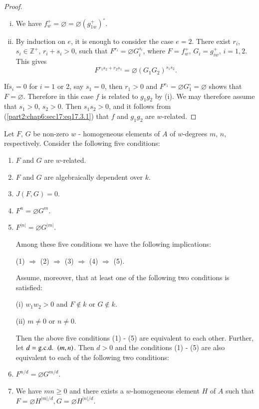 \begin{proof}
  ~
\begin{enumerate}[(i)]
  \item We have $f_w^+= \diameter = \diameter (g_{1w}^+)^\circ$.
    \item By induction on $e$, it is enough to consider the case
      $e=2$. There exist $r_i$, $s_i \in \mathbb{Z}^+$, $r_i + s_i >
      0$, such that $F^{r_i}= \diameter G_i^{s_i}$, where $F= f_w^+$,
      $G_i = g_{iw}^+$, $i= 1, 2$. This gives
      \begin{equation*}
        F^{r_1 s_2 + r_2 s_1} = \diameter (G_1 G_2)^{s_1
          s_2}. \tag{17.3.1} \label{part2:chap6:sec17:eq17.3.1}
      \end{equation*}
\end{enumerate}

If\pageoriginale $s_i=0$ for $i=1$ or 2, say $s_1=0$, then $r_1 > 0$
and $F^{r_1}= \diameter G_1^\circ= \diameter$ shows that $F=
\diameter$. Therefore in this case $f$ is related to $g_1 g_2$ by
(i). We may therefore assume that $s_1> 0$, $s_2> 0$. Then $s_1 s_2 >
0$, and it follows from (\ref{part2:chap6:sec17:eq17.3.1}) that $f$
and $g_1 g_2$ are $w$-related.
\end{proof}

\begin{prop}\label{part2:chap6:sec17:prop17.4}
  Let $F$, $G$ be non-zero $w$ - homogeneous elements of $A$ of
  $w$-degrees $m$, $n$, respectively. Consider the following five
  conditions:
  \begin{enumerate}
  \renewcommand{\labelenumi}{(\theenumi)}
  \item $F$ and $G$ are $w$-related.
    \item $F$ and $G$ are algebraically dependent over $k$.
      \item $J(F, G)=0$.
        \item $F^n = \diameter G^m$.
          \item $F^{|n|}= \diameter G^{|m|}$.

  Among these five conditions we have the following implications:

(1) $\Rightarrow$ (2) $\Rightarrow$ (3) $\Rightarrow$ (4)
  $\Rightarrow$ (5).

Assume, moreover, that at least one of the following two conditions is
satisfied:

(i) $w_1 w_2 > 0$ and $F \notin k$ or $G \notin k$.

(ii) $m \neq 0$ or $n \neq 0$.

Then the above five conditions (1) - (5) are equivalent to each
other. Further, let $d=\text{\gcd}~ (m, n)$. Then $d > 0$ and the
conditions (1) - (5) are also equivalent to each of the following two
conditions: 
\item $F^{n/d}= \diameter G^{m/d}$.
  \item We have $mn \geq 0$ and there exists a $w$-homogeneous element
    $H$ of $A$ such that $F= \diameter H^{|m|/d}, G= \diameter H^{|n|/d}$.
  \end{enumerate}
\end{prop}

